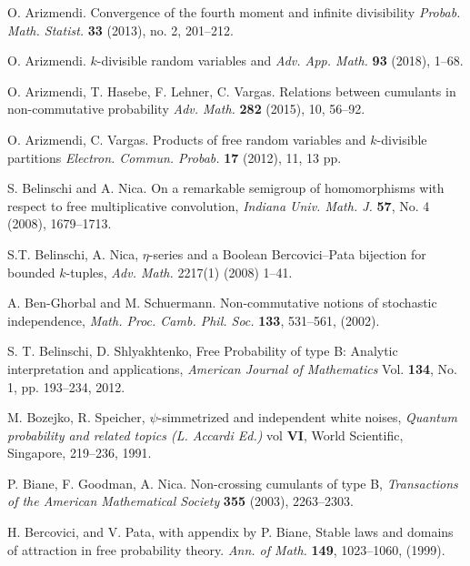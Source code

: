 \documentclass[ECP]{ejpecp} %
\begin{document}
%
%


\begin{thebibliography}{99}

 O. Arizmendi. Convergence of the fourth moment and infinite divisibility 
\emph{Probab. Math. Statist.} {\bf 33} (2013), no. 2, 201--212.

 O. Arizmendi. $k$-divisible random variables and  
\emph{Adv. App. Math.} {\bf 93} (2018), 1--68.

 O. Arizmendi, T. Hasebe, F. Lehner, C. Vargas. Relations between cumulants in non-commutative probability 
\emph{Adv. Math.} {\bf 282} (2015), 10, 56--92.

 O. Arizmendi, C. Vargas. Products of free random variables and $k$-divisible partitions  
\emph{Electron. Commun. Probab.} {\bf 17} (2012), 11, 13 pp.

 S. Belinschi and A. Nica. On a remarkable semigroup of homomorphisms with
respect to free multiplicative convolution, \emph{Indiana Univ. Math. J.} {\bf 57}, No. 4 (2008),
1679--1713.

 S.T. Belinschi, A. Nica, $\eta$-series and a Boolean Bercovici–Pata bijection for bounded $k$-tuples, \emph{Adv. Math. } 2217(1) (2008) 1--41.

 A. Ben-Ghorbal and M. Schuermann. Non-commutative notions of
stochastic independence, \emph{Math. Proc. Camb. Phil. Soc.} {\bf 133}, 531--561, (2002).

 S. T. Belinschi, D. Shlyakhtenko, Free Probability of type B: Analytic interpretation and applications, \emph{American Journal of Mathematics} Vol. {\bf 134}, No. 1, pp. 193--234, 2012.

 M. Bozejko, R. Speicher, $\psi$-simmetrized and independent white noises, \emph{Quantum probability and related topics (L. Accardi Ed.)} vol {\bf VI}, World Scientific, Singapore, 219--236, 1991.

 P. Biane, F. Goodman, A. Nica. Non-crossing cumulants of type B, \emph{Transactions of the American Mathematical Society} {\bf 355} (2003), 2263--2303.

 H. Bercovici, and V. Pata, with appendix by P. Biane, Stable laws and domains of attraction in free probability theory.
\emph{Ann. of Math.} {\bf 149}, 1023--1060, (1999).


\end{thebibliography}
\end{document}
